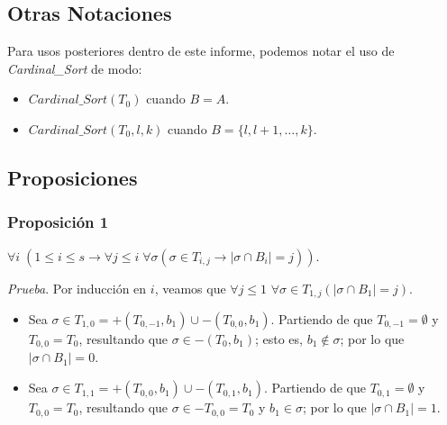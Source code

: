 \documentclass[12pt, letterpaper, twoside]{article}
\begin{document}
    \newpage
    \subsection{Otras Notaciones}
    Para usos posteriores dentro de este informe, podemos notar el uso de \emph{Cardinal\_Sort} de modo:
    \begin{itemize}
        \item $Cardinal\_Sort(T_0)$ cuando $B=A$.
        \item $Cardinal\_Sort(T_0, l, k)$ cuando $B=\{l, l+1,\dots,k\}$.
    \end{itemize}

    \subsection{Proposiciones}
    \subsubsection{Proposición 1}
    $\forall{i}\;(1\leq{i}\leq{s}\rightarrow\forall{j}\leq{i}\;\forall{\sigma}(\sigma\in{T_{i,j}}\rightarrow|\sigma\cap{B_i}|=j))$.

    \emph{Prueba}. Por inducción en $i$, veamos que $\forall{j}\leq{1}$ $\forall\sigma\in{T_{1,j}}(|\sigma\cap{B_1}|=j)$.
    \begin{itemize}
        \item Sea $\sigma\in{T_{1,0}} = +(T_{0,-1}, b_1) \cup -(T_{0,0}, b_1).$ Partiendo de que $T_{0,-1}=\emptyset$ y $T_{0,0}=T_0$, resultando que $\sigma\in{-(T_0,b_1)}$; esto es, $b_1\notin\sigma$; por lo que $|\sigma\cap{B_1}|=0$.
        \item Sea $\sigma\in{T_{1,1}} = +(T_{0,0}, b_1) \cup -(T_{0,1}, b_1).$ Partiendo de que $T_{0,1}=\emptyset$ y $T_{0,0}=T_0$, resultando que $\sigma\in{-T_{0,0}}=T_0$ y $b_1\in\sigma$; por lo que $|\sigma\cap{B_1}|=1$.
    \end{itemize}
\end{document}
